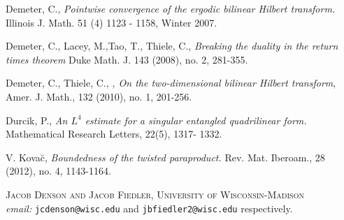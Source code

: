 \documentclass[12pt]{article}
\begin{document}
\begin{thebibliography}{03}

 Demeter, C., \emph{ Pointwise convergence of the ergodic bilinear Hilbert transform.} Illinois J. Math. 51 (4) 1123 - 1158, Winter 2007.

Demeter, C., Lacey, M.,Tao, T., Thiele, C., \emph{ Breaking the duality in the return times theorem} Duke
Math. J. 143 (2008), no. 2, 281-355.

 Demeter, C., Thiele, C.,\emph{ , On the two-dimensional bilinear Hilbert transform}, Amer. J. Math., 132
(2010), no. 1, 201-256.

 Durcik, P.,
\emph{ An $L^4$ estimate for a singular entangled quadrilinear form.} 
Mathematical Research Letters, 22(5), 1317-
1332.

 V. Kova\u{c},\emph{ Boundedness of the twisted paraproduct.} Rev. Mat. Iberoam., 28 (2012), no. 4, 1143-1164.




\end{thebibliography}

\noindent \textsc{Jacob Denson and Jacob Fiedler, University of Wisconsin-Madison}\\
\textit{email:} \texttt{jcdenson@wisc.edu} and \texttt{jbfiedler2@wisc.edu} respectively.

\end{document}
